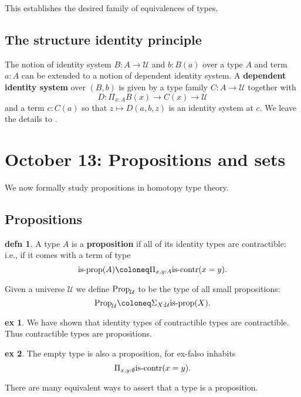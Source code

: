 \documentclass{amsart}
\theoremstyle{theorem}
\theoremstyle{definition}
\newtheorem*{defn}{defn}
\newtheorem*{ex}{ex}
\theoremstyle{remark}
\newcommand{\0}{\mathbbe{0}}
\newcommand{\1}{\mathbbe{1}}
\newcommand{\2}{\mathbbe{2}}
\newcommand{\3}{\mathbbe{3}}
\newcommand{\4}{\mathbbe{4}}
\newcommand{\type}[1]{{\textup{#1}}}
\newcommand{\UU}{{\mathcal{U}}}
\newcommand{\is}[1]{\type{is-{#1}}}
\newcommand{\iscontr}{\type{is-contr}}
\newcommand{\isprop}{\type{is-prop}}
\newcommand{\Prop}{\type{Prop}_{\UU}}
\begin{document}
This establishes the desired family of equivalences of types.

\subsection*{The structure identity principle}

The notion of identity system $B : A \to \UU$ and $b : B(a)$ over a type $A$ and term $a:A$ can be extended to a notion of dependent identity system. A \textbf{dependent identity system} over $(B,b)$ is given by a type family $C : A \to \UU$ together with 
\[ D : \Pi_{x:A} B(x) \to C(x) \to \UU\] and a term $c : C(a)$ so that $z \mapsto D(a,b,z)$ is an identity system at $c$. We leave the details to \cite[\S11.6]{Rijke}.

\section*{October 13: Propositions and sets}

We now formally study propositions in homotopy type theory.

\subsection*{Propositions}

\begin{defn} A type $A$ is a \textbf{proposition} if all of its identity types are contractible: i.e., if it comes with a term of type
\[ \is{prop}(A) \coloneq \Pi_{x,y:A} \is{contr}(x=y).\]
\end{defn}

Given a universe $\UU$ we define $\Prop$ to be the type of all small propositions:
\[ \Prop \coloneq \Sigma_{X: \UU}\isprop(X).\]

\begin{ex} We have shown that identity types of contractible types are contractible. Thus contractible types are propositions.
\end{ex}

\begin{ex} The empty type is also a proposition, for ex-falso inhabits
\[ \Pi_{x,y: \emptyset} \iscontr(x=y).\]
\end{ex}

There are many equivalent ways to assert that a type is a proposition.
\end{document}
